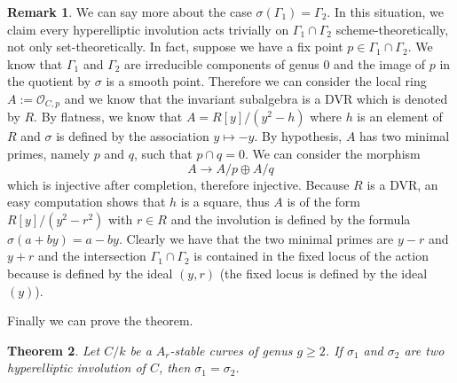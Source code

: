 \documentclass{alggeom}
\numberwithin{equation}{section}
\numberwithin{subsection}{section}
\newtheorem{theorem}{Theorem}[section]
\theoremstyle{definition}
\newtheorem{remark}[theorem]{Remark}
\theoremstyle{remark}
\newcommand\cO{\mathcal{O}} \newcommand\cP{\mathcal{P}}
\begin{document}
\begin{remark}\label{rem:part-case}
	We can say more about the case $\sigma(\Gamma_1)=\Gamma_2$. In this situation, we claim every hyperelliptic involution acts trivially on $\Gamma_1\cap \Gamma_2$ scheme-theoretically, not only set-theoretically. In fact, suppose we have a fix point $p\in \Gamma_1\cap\Gamma_2$.  We know that $\Gamma_1$ and $\Gamma_2$ are irreducible components of genus $0$ and the image of $p$ in the quotient by $\sigma$ is a smooth point. Therefore we can consider the local ring $A:=\cO_{C,p}$ and we know that the invariant subalgebra is a DVR which is denoted by $R$. By flatness, we know that $A=R[y]/(y^2-h)$ where $h$ is an element of $R$ and $\sigma$ is defined by the association $y\mapsto -y$. By hypothesis, $A$ has two minimal primes, namely $p$ and $q$, such that $p\cap q=0$. We can consider the morphism 
	$$A \rightarrow A/p\oplus A/q$$
	which is injective after completion, therefore injective. Because $R$ is a DVR, an easy computation shows that $h$ is a square, thus $A$ is of the form $R[y]/(y^2-r^2)$ with $r\in R$ and the involution is defined by the formula $\sigma(a+by)=a-by$. Clearly we have that the two minimal primes are $y-r$ and $y+r$ and the intersection $\Gamma_1\cap\Gamma_2$ is contained in the fixed locus of the action because is defined by the ideal $(y,r)$ (the fixed locus is defined by the ideal $(y)$).
 \end{remark}
Finally we can prove the theorem.
\begin{theorem}
	Let $C/k$ be a $A_r$-stable curves of genus $g\geq 2$. If $\sigma_1$ and $\sigma_2$ are two hyperelliptic involution of $C$, then $\sigma_1=\sigma_2$.
\end{theorem}
\end{document}
